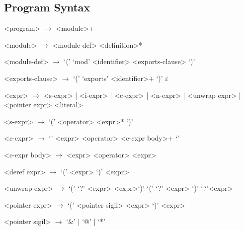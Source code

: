 \subsection{Program Syntax}

\begin{grammar}
<program> $\to$ <module>+

<module> $\to$ <module-def> <definition>*

<module-def> $\to$ `(' `mod' <identifier> <exports-clause> `)'

<exports-clause> $\to$ `(' `exports' <identifier>+ `)'
                \alt $\varepsilon$


<expr> $\to$ <s-expr> | <i-expr> | <c-expr> | <n-expr>
         | <unwrap expr> | <pointer expr>
        \alt <literal>

<s-expr> $\to$ `(' <operator>  <expr>* `)'

<c-expr> $\to$ `{' <expr> <operator> <c-expr body>+ `}'

<c-expr body> $\to$ <expr> <operator>
              \alt <expr>

<deref expr> $\to$ `(' \lit{\$} <expr> `)'
             \alt \lit{\$} <expr>

<unwrap expr> $\to$ `(' `?' <expr> <expr>`)'
             \alt `(' `?' <expr> `)'
             \alt `?'<expr>

<pointer expr> $\to$ `(' <pointer sigil> <expr> `)'
              <expr>

<pointer sigil> $\to$ `&' | `@' | `*'

\end{grammar}
